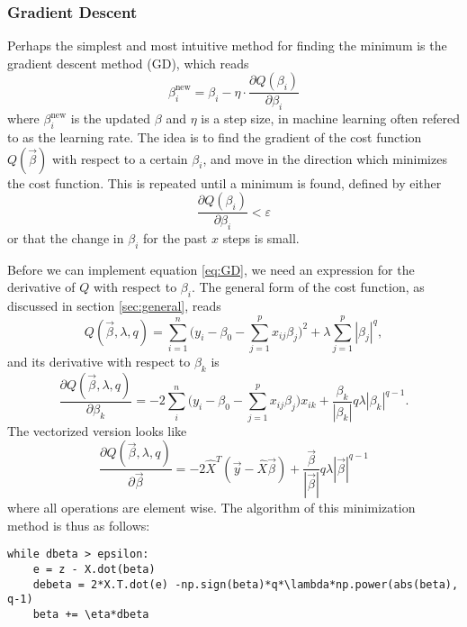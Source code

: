 \subsubsection{Gradient Descent} \label{sec:gd}
Perhaps the simplest and most intuitive method for finding the minimum is the gradient descent method (GD), which reads
\begin{equation}
\label{eq:GD}
\beta_i^{\text{new}}=\beta_i - \eta\cdot\frac{\partial Q(\beta_i)}{\partial\beta_i}
\end{equation}
where $\beta_i^{\text{new}}$ is the updated $\beta$ and $\eta$ is a step size, in machine learning often refered to as the learning rate. The idea is to find the gradient of the cost function $Q(\vec{\beta})$ with respect to a certain $\beta_i$, and move in the direction which minimizes the cost function. This is repeated until a minimum is found, defined by either
\begin{equation}
\frac{\partial Q(\beta_i)}{\partial\beta_i}<\varepsilon
\end{equation}
or that the change in $\beta_i$ for the past $x$ steps is small. 
\par 
\vspace{3mm}

Before we can implement equation \eqref{eq:GD}, we need an expression for the derivative of $Q$ with respect to $\beta_i$. The general form of the cost function, as discussed in section \ref{sec:general}, reads
\begin{equation}
Q(\vec{\beta},\lambda,q)=\sum_{i=1}^{n}\Big(y_i-\beta_0-\sum_{j=1}^px_{ij}\beta_j\Big)^2+\lambda\sum_{j=1}^p|\beta_j|^q,
\label{eq:cost_gen}
\end{equation}
and its derivative with respect to $\beta_k$ is
\begin{equation}
\frac{\partial Q(\vec{\beta},\lambda,q)}{\partial\beta_k}=-2\sum_i^n\Big(y_i-\beta_0-\sum_{j=1}^px_{ij}\beta_j\Big)x_{ik}+\frac{\beta_k}{|\beta_k|}q\lambda|\beta_k|^{q-1}.
\label{eq:der_cost_gen}
\end{equation}
The vectorized version looks like
\begin{equation}
\frac{\partial Q(\vec{\beta},\lambda,q)}{\partial\vec{\beta}}=-2\hat{X}^T(\vec{y}-\hat{X}\vec{\beta})+\frac{\vec{\beta}}{|\vec{\beta}|}q\lambda|\vec{\beta}|^{q-1}
\label{eq:der_cost_gen_vec}
\end{equation}
where all operations are element wise. The algorithm of this minimization method is thus as follows:

\lstset{basicstyle=\scriptsize}
\begin{lstlisting}
while dbeta > epsilon:
	e = z - X.dot(beta)
    debeta = 2*X.T.dot(e) -np.sign(beta)*q*\lambda*np.power(abs(beta), q-1)
    beta += \eta*dbeta
\end{lstlisting}